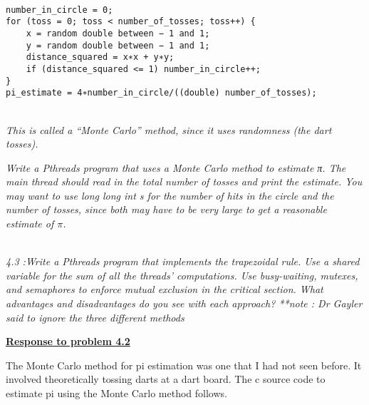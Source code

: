 \documentclass{article}
\begin{document}
\lstset{language=C,
	xleftmargin=16pt,
        framextopmargin=6pt,
        framexbottommargin=6pt, 
        frame=tb, framerule=0pt,}

\begin{lstlisting}

number_in_circle = 0;
for (toss = 0; toss < number_of_tosses; toss++) {
	x = random double between − 1 and 1;
	y = random double between − 1 and 1;
	distance_squared = x∗x + y∗y;
	if (distance_squared <= 1) number_in_circle++;
}
pi_estimate = 4∗number_in_circle/((double) number_of_tosses);

\end{lstlisting}

\noindent \emph
{
	\\This is called a “Monte Carlo” method, since it uses randomness (the dart
	tosses).
}

\emph
{
	Write a Pthreads program that uses a Monte Carlo method to estimate π.
	The main thread should read in the total number of tosses and print the estimate.
	You may want to use long long int s for the number of hits in the circle and
	the number of tosses, since both may have to be very large to get a reasonable
	estimate of $\pi$.
}

\bigskip

\emph
{
	\\4.3 :Write a Pthreads program that implements the trapezoidal rule. Use a shared
	variable for the sum of all the threads’ computations. Use busy-waiting,
	mutexes, and semaphores to enforce mutual exclusion in the critical section.
	What advantages and disadvantages do you see with each approach?
	**note : Dr Gayler said to ignore the three different methods
} 

\bigskip

\noindent \textbf{\underline{Response to problem 4.2}}

\bigskip

The Monte Carlo method for pi estimation was one that I had not seen before. It involved
theoretically tossing darts at a dart board. The c source code to estimate pi using the 
Monte Carlo method follows. 

\lstset{language=C,
	xleftmargin=1pt,
        framextopmargin=6pt,
        framexbottommargin=6pt, 
        frame=tb, framerule=0pt,}
\end{document}
